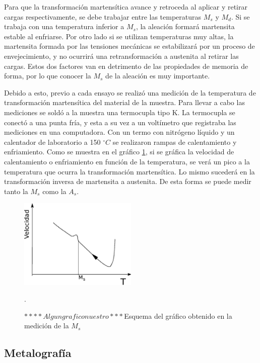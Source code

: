 \documentclass[a4paper,12pt,fleqn,twoside,openany]{book}
\begin{document}
Para que la transformación martensítica avance y retroceda al aplicar y retirar cargas respectivamente,  se debe trabajar entre las temperaturas $M_s$ y $M_d$. Si se trabaja con una temperatura inferior a $M_s$, la aleación formará martensita estable al enfriarse. Por otro lado si se utilizan temperaturas muy altas, la martensita formada  por las tensiones mecánicas se estabilizará por un proceso de envejecimiento, y no ocurrirá una retransformación a austenita al retirar las cargas. Estos dos factores van en detrimento de las propiedades de memoria de forma, por lo que conocer la $M_s$ de la aleación es muy importante.

Debido a esto, previo a cada ensayo se realizó una medición de la temperatura de transformación martensítica del material de la muestra.
Para llevar a cabo las mediciones se soldó a la muestra una termocupla tipo K. La termocupla se conectó a una punta fría, y esta a su vez a un voltímetro que registraba las mediciones en una computadora. Con un termo con nitrógeno líquido y un calentador de laboratorio a 150 $^\circ C$  se realizaron rampas de calentamiento y enfriamiento. 
Como se muestra en el gráfico \ref{fig:Ms}, si se gráfica la velocidad de calentamiento o enfriamiento en función de la temperatura, se verá un pico a la temperatura que ocurra la transformación martensítica. Lo mismo sucederá en la transformación inversa de martensita a austenita. De esta forma se puede medir tanto la $M_s$ como la $A_s$.



\begin{figure}[h]
 \centering
 \includegraphics[width=0.5\textwidth]{Img/Procedimiento/Ms.eps}
 \caption{$****Algun grafico nuestro***$Esquema del gráfico obtenido en la medición de la $M_s$}. 
 \label{fig:Ms}
 \end{figure}


\subsection{Metalografía}
\end{document}
